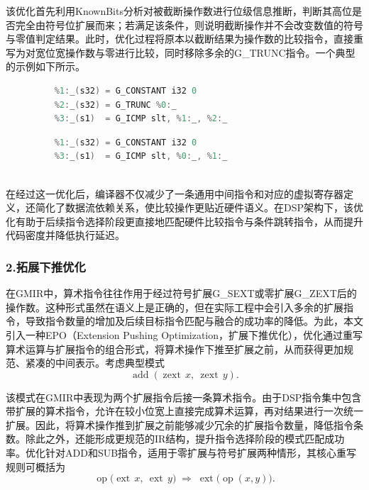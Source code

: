 \par

该优化首先利用KnownBits分析对被截断操作数进行位级信息推断，判断其高位是否完全由符号位扩展而来；若满足该条件，则说明截断操作并不会改变数值的符号与零值判定结果。此时，优化过程将原本以截断结果为操作数的比较指令，直接重写为对宽位宽操作数与零进行比较，同时移除多余的G\_TRUNC指令。一个典型的示例如下所示。

\begin{figure}[htbp]
	\centering
	\begin{minipage}[t]{0.48\linewidth}
		\captionsetup{type=lstlisting}
		\begin{lstlisting}[language=C++]
	%0:_(s64) = COPY $d0
	%1:_(s32) = G_CONSTANT i32 0
	%2:_(s32) = G_TRUNC %0:_
	%3:_(s1)  = G_ICMP slt, %1:_, %2:_
		\end{lstlisting}
	\end{minipage}\hfill
	\begin{minipage}[t]{0.48\linewidth}
		\captionsetup{type=lstlisting}
		\begin{lstlisting}[language=C++]
	%0:_(s64) = COPY $d0
	%1:_(s32) = G_CONSTANT i32 0
	%3:_(s1)  = G_ICMP slt, %0:_, %1:_
			
		\end{lstlisting}
	\end{minipage}
\end{figure}

在经过这一优化后，编译器不仅减少了一条通用中间指令和对应的虚拟寄存器定义，还简化了数据流依赖关系，使比较操作更贴近硬件语义。在DSP架构下，该优化有助于后续指令选择阶段更直接地匹配硬件比较指令与条件跳转指令，从而提升代码密度并降低执行延迟。


\subsubsection{2.拓展下推优化}
在GMIR中，算术指令往往作用于经过符号扩展G\_SEXT或零扩展G\_ZEXT后的操作数。这种形式虽然在语义上是正确的，但在实际工程中会引入多余的扩展指令，导致指令数量的增加及后续目标指令匹配与融合的成功率的降低。为此，本文引入一种EPO（Extension Pushing Optimization，扩展下推优化），优化通过重写算术运算与扩展指令的组合形式，将算术操作下推至扩展之前，从而获得更加规范、紧凑的中间表示。考虑典型模式
\begin{equation}
\operatorname{add}(\operatorname{zext}\, x,\ \operatorname{zext}\, y).
\end{equation}

该模式在GMIR中表现为两个扩展指令后接一条算术指令。由于DSP指令集中包含带扩展的算术指令，允许在较小位宽上直接完成算术运算，再对结果进行一次统一扩展。因此，将算术操作推到扩展之前能够减少冗余的扩展指令数量，降低指令条数。除此之外，还能形成更规范的IR结构，提升指令选择阶段的模式匹配成功率。优化针对ADD和SUB指令，适用于零扩展与符号扩展两种情形，其核心重写规则可概括为
\begin{equation}
\operatorname{op}\bigl(\operatorname{ext}\, x,\ \operatorname{ext}\, y\bigr)
\;\Rightarrow\;
\operatorname{ext}\!\bigl(\operatorname{op}(x, y)\bigr).
\end{equation}

